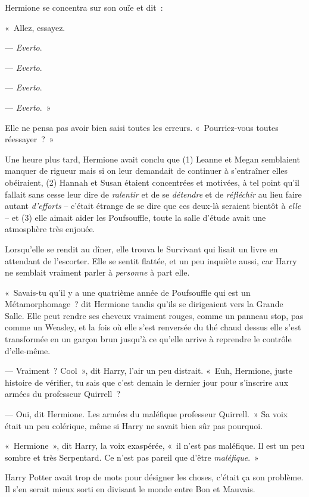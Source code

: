 Hermione se concentra sur son ouïe et dit~:

«~Allez, essayez.

--- \emph{Everto}.

--- \emph{Everto}.

--- \emph{Everto}.

--- \emph{Everto}.~»

Elle ne pensa pas avoir bien saisi toutes les erreurs. «~Pourriez-vous toutes réessayer~?~»

Une heure plus tard, Hermione avait conclu que (1) Leanne et Megan semblaient manquer de rigueur mais si on leur demandait de continuer à s'entraîner elles obéiraient, (2) Hannah et Susan étaient concentrées et motivées, à tel point qu'il fallait sans cesse leur dire de \emph{ralentir} et de se \emph{détendre} et de \emph{réfléchir} au lieu faire autant \emph{d'efforts} -- c'était étrange de se dire que ces deux-là seraient bientôt à \emph{elle} -- et (3) elle aimait aider les Poufsouffle, toute la salle d'étude avait une atmosphère très enjouée.

Lorsqu'elle se rendit au dîner, elle trouva le Survivant qui lisait un livre en attendant de l'escorter. Elle se sentit flattée, et un peu inquiète aussi, car Harry ne semblait vraiment parler à \emph{personne} à part elle.

«~Savais-tu qu'il y a une quatrième année de Poufsouffle qui est un Métamorphomage~? dit Hermione tandis qu'ils se dirigeaient vers la Grande Salle. Elle peut rendre ses cheveux vraiment rouges, comme un panneau stop, pas comme un Weasley, et la fois où elle s'est renversée du thé chaud dessus elle s'est transformée en un garçon brun jusqu'à ce qu'elle arrive à reprendre le contrôle d'elle-même.

--- Vraiment~? Cool~», dit Harry, l'air un peu distrait. «~Euh, Hermione, juste histoire de vérifier, tu sais que c'est demain le dernier jour pour s'inscrire aux armées du professeur Quirrell~?

--- Oui, dit Hermione. Les armées du maléfique professeur Quirrell.~» Sa voix était un peu colérique, même si Harry ne savait bien sûr pas pourquoi.

«~Hermione~», dit Harry, la voix exaspérée, «~il n'est pas maléfique. Il est un peu sombre et très Serpentard. Ce n'est pas pareil que d'être \emph{maléfique}.~»

Harry Potter avait trop de mots pour désigner les choses, c'était ça son problème. Il s'en serait mieux sorti en divisant le monde entre Bon et Mauvais.

